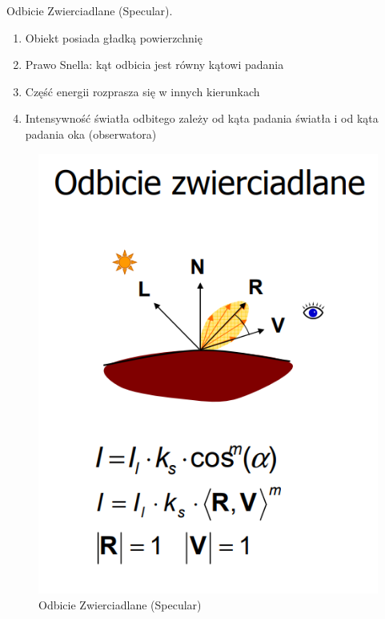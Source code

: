 \documentclass[12pt]{article}
\begin{document}
Odbicie Zwierciadlane (Specular).
\begin{enumerate}
\item Obiekt posiada gładką powierzchnię
\item Prawo Snella: kąt odbicia jest równy kątowi padania
\item Część energii rozprasza się w innych kierunkach
\item Intensywność światła odbitego zależy od kąta padania światła i od kąta padania oka (obserwatora)
\end{enumerate}
\begin{figure}[H]
	\centering
	\includegraphics[scale=0.5]{Pictures/specular.png}
	\caption{Odbicie Zwierciadlane (Specular)}
\end{figure}
\end{document}
